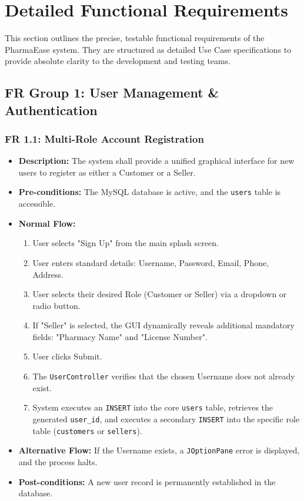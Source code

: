 \documentclass[12pt,a4paper]{report}
\begin{document}
\clearpage

\chapter{Detailed Functional Requirements}

This section outlines the precise, testable functional requirements of the PharmaEase system. They are structured as detailed Use Case specifications to provide absolute clarity to the development and testing teams.

\section{FR Group 1: User Management \& Authentication}

\subsection{FR 1.1: Multi-Role Account Registration}
\begin{itemize}
    \item \textbf{Description:} The system shall provide a unified graphical interface for new users to register as either a Customer or a Seller.
    \item \textbf{Pre-conditions:} The MySQL database is active, and the \texttt{users} table is accessible.
    \item \textbf{Normal Flow:}
        \begin{enumerate}
            \item User selects "Sign Up" from the main splash screen.
            \item User enters standard details: Username, Password, Email, Phone, Address.
            \item User selects their desired Role (Customer or Seller) via a dropdown or radio button.
            \item If "Seller" is selected, the GUI dynamically reveals additional mandatory fields: "Pharmacy Name" and "License Number".
            \item User clicks Submit.
            \item The \texttt{UserController} verifies that the chosen Username does not already exist.
            \item System executes an \texttt{INSERT} into the core \texttt{users} table, retrieves the generated \texttt{user\_id}, and executes a secondary \texttt{INSERT} into the specific role table (\texttt{customers} or \texttt{sellers}).
        \end{enumerate}
    \item \textbf{Alternative Flow:} If the Username exists, a \texttt{JOptionPane} error is displayed, and the process halts.
    \item \textbf{Post-conditions:} A new user record is permanently established in the database.
\end{itemize}
\end{document}
